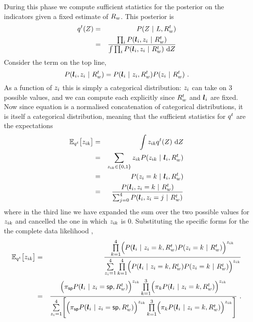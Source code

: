 During this phase we compute sufficient statistics for the posterior on
the indicators given a fixed estimate of $\SceneR$. This posterior
is
\begin{eqnarray}
  \PosteriorEst^t(\Indicators) &=&
  P(\Indicators ~|~ \LineSegs,\SceneR^t) \\
  \label{eq:posterior-est}
  &=&
  \frac{
    \prod_i P(\LineSeg_i,\Indicator_i ~|~\SceneR^t)
  }{
    \int \prod_i P(\LineSeg_i,\Indicator_i ~|~ \SceneR^t)
    ~\intd\Indicators
  }
\end{eqnarray}
Consider the term on the top line,
\begin{equation}
  P(\LineSeg_i,\Indicator_i ~|~\SceneR^t)
  =
  P(\LineSeg_i ~|~ \Indicator_i,\SceneR^t)
  P(\Indicator_i ~|~ \SceneR^t) ~.
\end{equation}
As a function of $\Indicator_i$ this is simply a categorical
distribution: $\Indicator_i$ can take on 3 possible values, and we can
compute each explicitly since $\SceneR^t$ and $\LineSeg_i$ are
fixed. Now since equation  is a
normalised concatenation of categorical distributions, it is
itself a categorical distribution, meaning that the sufficient
statistics for $\PosteriorEst^t$ are the
expectations
\begin{eqnarray}
  \Expected_{\PosteriorEst^t}\bigl[ \Indicator_{ik} \bigr]
  &=& 
  \int \Indicator_{ik} \PosteriorEst^t(\Indicators) ~\intd\Indicators \\
  &=& 
  \sum_{\Indicator_{ik}\in\{0,1\}}
  \Indicator_{ik} P(\Indicator_{ik} ~|~ \LineSeg_i, \SceneR^t)\\
  &=&
  P(\Indicator_i=k ~|~ \LineSeg_i, \SceneR^t)\\
  &=&
  \label{eq:expected-zik}
  \frac
      {P( \LineSeg_i, \Indicator_i=k ~|~ \SceneR^t)}
      {\sum_{j=0}^4 P(\LineSeg_i, \Indicator_i=j ~|~ \SceneR^t)}
\end{eqnarray}
where in the third line we have expanded the sum over the two possible
values for $\Indicator_{ik}$ and cancelled the one in which
$\Indicator_{ik}$ is 0. Substituting the specific forms for the the
complete data likelihood ,
\begin{eqnarray}
  \Expected_{\PosteriorEst^t}\bigl[ \Indicator_{ik} \bigr] 
  &=&
  \frac{
    \prod_{k=1}^4\limits \Bigl( 
    P(\LineSeg_i ~|~ \Indicator_i=k,\SceneR^t)
    P(\Indicator_i=k ~|~ \SceneR^t)
    \Bigr)^{\Indicator_{ik}}
  }{
    \sum_{\Indicator_i=1}^4\limits
    \prod_{k=1}^4\limits \Bigl( 
    P(\LineSeg_i ~|~ \Indicator_i=k,\SceneR^t)
    P(\Indicator_i=k ~|~ \SceneR^t)
    \Bigr)^{\Indicator_{ik}}
  }\\
  \label{eq:big-expectation}
  &=&
  \frac{
    \Bigl(
    \Mixing_{\Spurious}
    P(\LineSeg_i ~|~ \Indicator_i=\Spurious,\SceneR^t)
    \Bigr)^{\Indicator_{ik}}
    \prod_{k=1}^3\limits \Bigl(
    \Mixing_k
    P(\LineSeg_i ~|~ \Indicator_i=k,\SceneR^t)
    \Bigr)^{\Indicator_{ik}}
  }{
    \sum_{\Indicator_i=1}^4\limits \Biggl[
      \Bigl(
      \Mixing_{\Spurious}
      P(\LineSeg_i ~|~ \Indicator_i=\Spurious,\SceneR^t)
      \Bigr)^{\Indicator_{ik}}
      \prod_{k=1}^3\limits \Bigl( 
      \Mixing_k
      P(\LineSeg_i ~|~ \Indicator_i=k,\SceneR^t)
      \Bigr)^{\Indicator_{ik}}
      \Biggr]
  }~.
\end{eqnarray}
